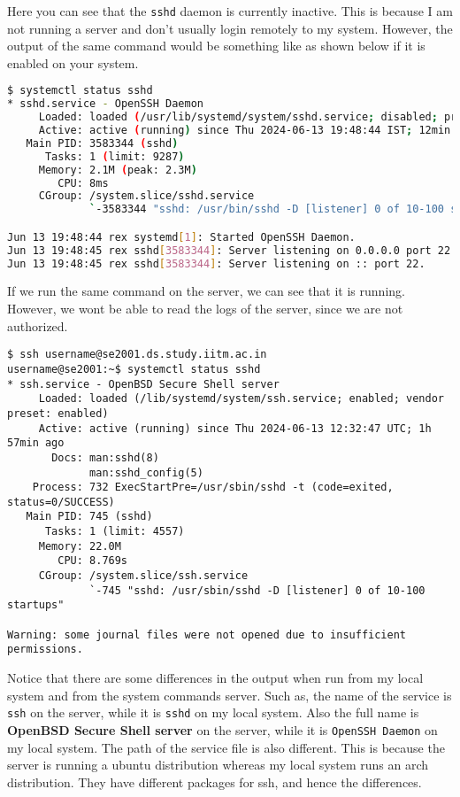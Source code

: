 Here you can see that the \lstinline|sshd| daemon is
currently inactive. This is because I am not running
a server and don't usually login remotely to my
system. However, the output of the same command
would be something like as shown below
if it is enabled on your system.


\begin{lstlisting}[language=bash]
$ systemctl status sshd
* sshd.service - OpenSSH Daemon
     Loaded: loaded (/usr/lib/systemd/system/sshd.service; disabled; preset: disabled)
     Active: active (running) since Thu 2024-06-13 19:48:44 IST; 12min ago
   Main PID: 3583344 (sshd)
      Tasks: 1 (limit: 9287)
     Memory: 2.1M (peak: 2.3M)
        CPU: 8ms
     CGroup: /system.slice/sshd.service
             `-3583344 "sshd: /usr/bin/sshd -D [listener] 0 of 10-100 startups"

Jun 13 19:48:44 rex systemd[1]: Started OpenSSH Daemon.
Jun 13 19:48:45 rex sshd[3583344]: Server listening on 0.0.0.0 port 22.
Jun 13 19:48:45 rex sshd[3583344]: Server listening on :: port 22.
\end{lstlisting}

If we run the same command on the server, we can see
that it is running. However, we wont be able to
read the logs of the server, since we are not
authorized.


\begin{lstlisting}
$ ssh username@se2001.ds.study.iitm.ac.in
username@se2001:~$ systemctl status sshd
* ssh.service - OpenBSD Secure Shell server
     Loaded: loaded (/lib/systemd/system/ssh.service; enabled; vendor preset: enabled)
     Active: active (running) since Thu 2024-06-13 12:32:47 UTC; 1h 57min ago
       Docs: man:sshd(8)
             man:sshd_config(5)
    Process: 732 ExecStartPre=/usr/sbin/sshd -t (code=exited, status=0/SUCCESS)
   Main PID: 745 (sshd)
      Tasks: 1 (limit: 4557)
     Memory: 22.0M
        CPU: 8.769s
     CGroup: /system.slice/ssh.service
             `-745 "sshd: /usr/sbin/sshd -D [listener] 0 of 10-100 startups"

Warning: some journal files were not opened due to insufficient permissions.
\end{lstlisting}

\begin{remark}
  Notice that there are some differences in the output
  when run from my local system and from the system
  commands server. Such as, the name of the service
  is \lstinline|ssh| on the server, while it is \lstinline|sshd|
  on my local system. Also the full name is \textbf{OpenBSD
  Secure Shell server} on the server, while it is
  \lstinline|OpenSSH Daemon| on my local system.
  The path of the service file is also different.
  This is because the server is running a ubuntu
  distribution whereas my local system runs an arch
  distribution. They have different packages for
  ssh, and hence the differences.
\end{remark}

